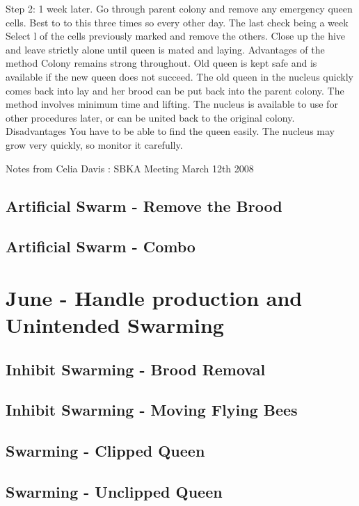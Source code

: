 \documentclass{./BeekeepingBook}
\begin{document}
Step 2: 1 week later.
Go through parent colony and remove any emergency queen cells.  Best to to this three times so every other day.  The last check being a week
Select l of the cells previously marked and remove the others.
Close up the hive and leave strictly alone until queen is mated and laying.
Advantages of the method
Colony remains strong throughout.
Old queen is kept safe and is available if the new queen does not succeed.
The old queen in the nucleus quickly comes back into lay and her brood can be put back into the parent colony.
The method involves minimum time and lifting.
The nucleus is available to use for other procedures later, or can be united back to the original colony.
Disadvantages
You have to be able to find the queen easily.
The nucleus may grow very quickly, so monitor it carefully.
 
Notes from Celia Davis : SBKA Meeting March 12th 2008




\subsection{Artificial Swarm - Remove the Brood}

\subsection{Artificial Swarm - Combo}



\section{June - Handle production and Unintended Swarming}

\subsection{Inhibit Swarming - Brood Removal}

\subsection{Inhibit Swarming - Moving Flying Bees}

\subsection{Swarming - Clipped Queen}

\subsection{Swarming - Unclipped Queen}
\end{document}
